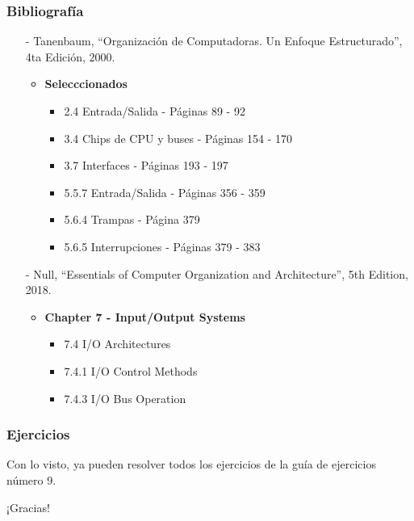 \documentclass[aspectratio=169]{beamer}
\begin{document}
\begin{frame}[fragile]
    \frametitle{Bibliografía}
    \begin{itemize}
     \setlength\itemsep{0.5cm}
    \item[-] \small Tanenbaum, “Organización de Computadoras. Un Enfoque Estructurado”, 4ta Edición, 2000.\\
    \begin{itemize}
     \item \textbf{Selecccionados}\\
     \begin{itemize}
      \item 2.4 Entrada/Salida - Páginas 89 - 92
      \item 3.4 Chips de CPU y buses - Páginas 154 - 170
      \item 3.7 Interfaces - Páginas 193 - 197
      \item 5.5.7 Entrada/Salida - Páginas 356 - 359
      \item 5.6.4 Trampas - Página 379
      \item 5.6.5 Interrupciones - Páginas 379 - 383
     \end{itemize}
    \end{itemize}
    \item[-] \small Null, “Essentials of Computer Organization and Architecture”, 5th Edition, 2018.\\
    \begin{itemize}
    \item \textbf{Chapter 7 - Input/Output Systems}    
     \begin{itemize}
        \item 7.4 I/O Architectures
        \item 7.4.1 I/O Control Methods
        \item 7.4.3 I/O Bus Operation
     \end{itemize}
    \end{itemize}
    \end{itemize}
\end{frame}

\begin{frame}[fragile]
    \frametitle{Ejercicios}
    Con lo visto, ya pueden resolver todos los ejercicios de la guía de ejercicios número 9.
\end{frame}

\begin{frame}[plain]
    \begin{center}
    \vspace{2cm}
    \huge ¡Gracias!\\
    \vspace{2cm}
    \end{center}
\end{frame}
\end{document}

